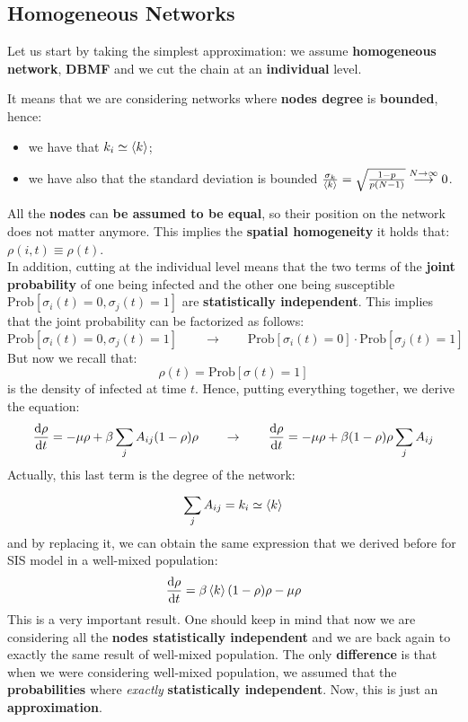 \documentclass[../main/main.tex]{subfiles}
\begin{document}
\subsection{Homogeneous Networks}
Let us start by taking the simplest approximation: we assume \textbf{homogeneous network}, \textbf{DBMF} and we cut the chain at an \textbf{individual} level.

It means that we are considering networks where \textbf{nodes degree} is \textbf{bounded}, hence:
\begin{itemize}
\item we have that \( k_i \simeq \expval{k}  \);
\item we have also that the standard deviation is bounded \( \frac{\sigma _k}{\expval{k} } = \sqrt{ \frac{1-p}{p(N-1)} } \overset{N \rightarrow \infty }{\longrightarrow} 0\).
\end{itemize}
All the \textbf{nodes} can \textbf{be assumed to be equal}, so their position on the network does not matter anymore. This implies the \textbf{spatial homogeneity} it holds that: \( \rho (i,t) \equiv \rho (t) \).\\
In addition, cutting at the individual level means that the two terms of the \textbf{joint probability} of one being infected and the other one being susceptible \( \text{Prob} [\sigma _i (t) = 0, \sigma _j (t ) =1 ] \) are \textbf{statistically independent}. This implies that the joint probability can be factorized as follows:
\begin{equation*}
  \text{Prob} [\sigma _i (t) = 0, \sigma _j (t ) =1 ] \qquad \rightarrow \qquad \text{Prob} [\sigma _i (t) = 0] \cdot \text{Prob} [\sigma _j (t ) =1 ]
\end{equation*}
But now we recall that:
\begin{equation*}
  \rho (t) = \text{Prob} [\sigma (t)=1]
\end{equation*}
is the density of infected at time \( t \).
Hence, putting everything together, we derive the equation:
\begin{equation*}
  \dv{\rho }{t} = - \mu \rho  + \beta \sum_{j}^{} A_{ij} (1- \rho ) \rho \qquad \rightarrow \qquad
   \dv{\rho }{t} = - \mu \rho  + \beta (1- \rho ) \rho \sum_{j}^{} A_{ij}
\end{equation*}
Actually, this last term is the degree of the network:
\begin{equation}
  \sum_{j}^{} A_{ij} = k_i \simeq \expval{k}
\end{equation}
and by replacing it, we can obtain the same expression that we derived before for SIS model in a well-mixed population:
\begin{equation}
  \dv{\rho }{t} = \beta \expval{k} (1- \rho ) \rho - \mu \rho
\end{equation}
This is a very important result.
One should keep in mind that now we are considering all the \textbf{nodes statistically independent} and we are back again to exactly the same result of well-mixed population. The only \textbf{difference} is that when we were considering well-mixed population, we assumed that the \textbf{probabilities} where \emph{exactly} \textbf{statistically independent}. Now, this is just an \textbf{approximation}.
\end{document}
